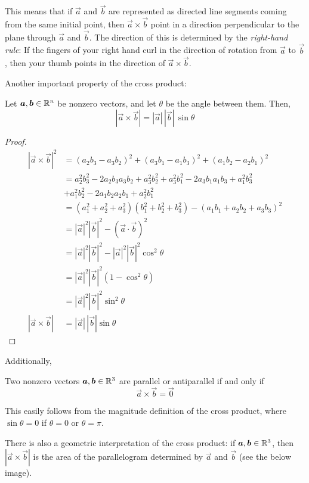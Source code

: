 This means that if \(\vec a\) and \(\vec b\) are represented as directed line segments coming from the same initial point, then \(\vec a \times \vec b\) point in a direction perpendicular to the plane through \(\vec a\) and \(\vec b\). The direction of this is determined by the \textit{right-hand rule}: If the fingers of your right hand curl in the direction of rotation from \(\vec a\) to \(\vec b\), then your thumb points in the direction of \(\vec a\times \vec b\).
\par 
Another important property of the cross product:
\begin{theorem}
    Let \(\boldsymbol{a}, \boldsymbol{b}\in \mathbb{R}^n\) be nonzero vectors, and let \(\theta\) be the angle between them. Then, \[|\vec a\times \vec b| = |\vec a|\,|\vec b|\,\sin\theta\]
\end{theorem}
\begin{proof}
    \begin{align*}
        |\vec a \times \vec b|^2 &= (a_2b_3-a_3b_2)^2+(a_3b_1-a_1b_3)^2+(a_1b_2-a_2b_1)^2 \\
        &= a_2^2b_3^2-2a_2b_3a_3b_2+a_3^2b_2^2 + a_3^2b_1^2-2a_3b_1a_1b_3+a_1^2b_3^2 \\ 
        &+ a_1^2b_2^2 - 2a_1b_2a_2b_1 + a_2^2b_1^2 \\
        &= (a_1^2+a_2^2+a_3^2)(b_1^2+b_2^2+b_3^2)-(a_1b_1+a_2b_2+a_3b_3)^2 \\
        &= |\vec a|^2|\vec b|^2 - (\vec a \cdot \vec b)^2 \\
        &= |\vec a|^2|\vec b|^2 - |\vec a|^2|\vec b|^2\cos^2\theta \\
        &= |\vec a|^2|\vec b|^2(1-\cos^2\theta) \\
        &= |\vec a|^2|\vec b|^2\sin^2\theta \\
        |\vec a \times \vec b| &= |\vec a|\,|\vec b|\sin\theta
    \end{align*}
\end{proof}
Additionally,
\begin{corollary}
    Two nonzero vectors \(\boldsymbol{a}, \boldsymbol{b} \in \mathbb{R}^3\) are parallel or antiparallel if and only if \[\vec a \times \vec b = \vec 0\]
\end{corollary}
This easily follows from the magnitude definition of the cross product, where \(\sin\theta = 0\) if \(\theta = 0\) or \(\theta = \pi\). \par
There is also a geometric interpretation of the cross product: if \(\boldsymbol{a}, \boldsymbol{b}\in \mathbb{R}^3\), then \(|\vec a \times \vec b|\) is the area of the parallelogram determined by \(\vec a\) and \(\vec b\) (see the below image).
